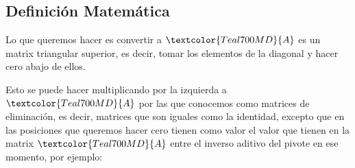 \documentclass[12pt, fleqn]{report}                             %
\theoremstyle{break}                                            %
\newcommand{\Color}[2]{\textcolor{#1}{#2}}                      %
\newcommand \ColorMatrixA       {Teal700MD}                     %
\newcommand \MatrixA      {\Color{\ColorMatrixA}{A}}            %
\begin{document}
        \clearpage
        \subsection{Definición Matemática}

            Lo que queremos hacer es convertir a $\MatrixA$ es un matrix triangular
            superior, es decir, tomar los elementos de la diagonal y hacer cero abajo
            de ellos.

            Esto se puede hacer multiplicando por la izquierda a $\MatrixA$ por las
            que conocemos como matrices de eliminación, es decir, matrices que
            son iguales como la identidad, excepto que en las posiciones que queremos
            hacer cero tienen como valor el valor que tienen en la matrix $\MatrixA$
            entre el inverso aditivo del pivote en ese momento, por ejemplo:
\end{document}
